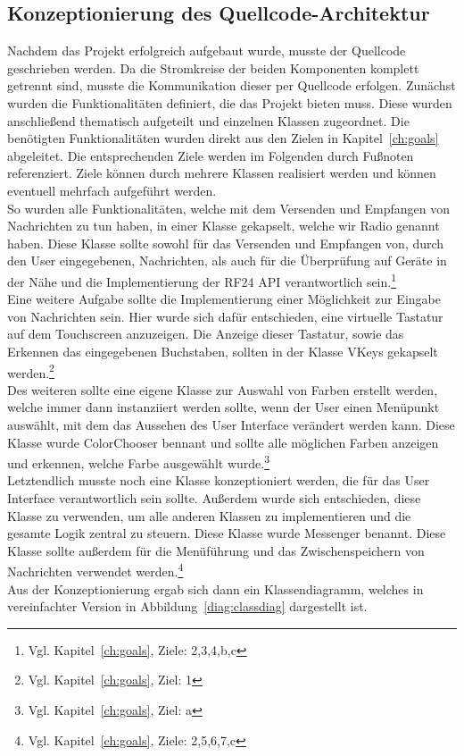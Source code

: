 \documentclass[a4paper, 11pt]{scrartcl}
\begin{document}
\subsection{Konzeptionierung des Quellcode-Architektur}
Nachdem das Projekt erfolgreich aufgebaut wurde, musste der Quellcode geschrieben werden. Da die Stromkreise der beiden Komponenten komplett getrennt sind,
musste die Kommunikation dieser per Quellcode erfolgen.
Zunächst wurden die Funktionalitäten definiert, die das Projekt bieten muss. Diese wurden anschließend thematisch aufgeteilt und einzelnen Klassen zugeordnet.
Die benötigten Funktionalitäten wurden direkt aus den Zielen in Kapitel~\ref{ch:goals} abgeleitet. Die entsprechenden Ziele werden im Folgenden durch Fußnoten
referenziert. Ziele können durch mehrere Klassen realisiert werden und können eventuell mehrfach aufgeführt werden.
\\
So wurden alle Funktionalitäten, welche mit dem Versenden und Empfangen von Nachrichten zu tun haben, in einer Klasse gekapselt, welche wir \glqq Radio\grqq{} genannt haben.
Diese Klasse sollte sowohl für das Versenden und Empfangen von, durch den User eingegebenen, Nachrichten, als auch für die Überprüfung auf Geräte in der Nähe und die
Implementierung der RF24 API verantwortlich sein.\footnote{Vgl. Kapitel~\ref{ch:goals}, Ziele: 2,3,4,b,c}
\\
Eine weitere Aufgabe sollte die Implementierung einer Möglichkeit zur Eingabe von Nachrichten sein. Hier wurde sich dafür entschieden, eine virtuelle Tastatur auf dem
Touchscreen anzuzeigen. Die Anzeige dieser Tastatur, sowie das Erkennen das eingegebenen Buchstaben, sollten in der Klasse \glqq VKeys\grqq{} gekapselt 
werden.\footnote{Vgl. Kapitel~\ref{ch:goals}, Ziel: 1}
\\
Des weiteren sollte eine eigene Klasse zur Auswahl von Farben erstellt werden, welche immer dann instanziiert werden sollte, wenn der User einen Menüpunkt auswählt,
mit dem das Aussehen des User Interface verändert werden kann. Diese Klasse wurde \glqq ColorChooser\grqq{} bennant und sollte alle möglichen Farben anzeigen 
und erkennen, welche Farbe ausgewählt wurde.\footnote{Vgl. Kapitel~\ref{ch:goals}, Ziel: a}
\\
Letztendlich musste noch eine Klasse konzeptioniert werden, die für das User Interface verantwortlich sein sollte. Außerdem wurde sich entschieden, diese Klasse
zu verwenden, um alle anderen Klassen zu implementieren und die gesamte Logik zentral zu steuern. Diese Klasse wurde \glqq Messenger\grqq{} benannt. Diese Klasse
sollte außerdem für die Menüführung und das Zwischenspeichern von Nachrichten verwendet werden.\footnote{Vgl. Kapitel~\ref{ch:goals}, Ziele: 2,5,6,7,c}
\\
Aus der Konzeptionierung ergab sich dann ein Klassendiagramm, welches in vereinfachter Version in Abbildung~\ref{diag:classdiag} dargestellt ist.
\end{document}

